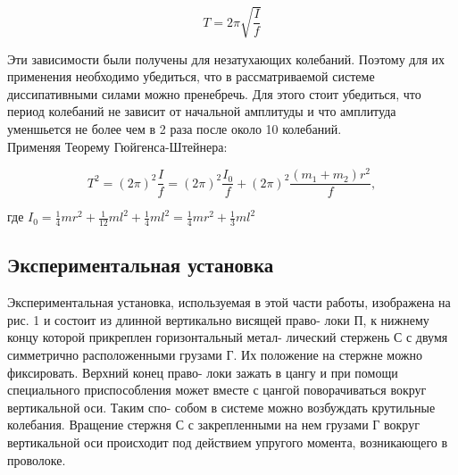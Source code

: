 \documentclass[a4paper, 12pt]{article}
\begin{document}
\begin{equation}
    T = 2\pi\sqrt{\frac{I}{f}}
\end{equation}

\bigskip

Эти зависимости были получены для незатухающих колебаний. Поэтому для их применения необходимо убедиться, что в рассматриваемой системе диссипативными силами можно пренебречь. Для этого стоит убедиться, что период колебаний не зависит от начальной амплитуды и что амплитуда уменшьется не более чем в 2 раза после около 10 колебаний.\\
Применяя Теорему Гюйгенса-Штейнера:

\bigskip

\begin{equation}
    T^2 = (2\pi)^2\frac{I}{f} = (2\pi)^2\frac{I_{0}}{f} + (2\pi)^2\frac{(m_{1}+m_{2})r^2}{f},
\end{equation}

\bigskip

\begin{center}
где $I_{0} = \frac{1}{4}mr^2 + \frac{1}{12}ml^2 + \frac{1}{4}ml^2 = \frac{1}{4}mr^2 + \frac{1}{3}ml^2$
\end{center}

\bigskip

\begin{center}
\subsection*{Экспериментальная установка}
\end{center}

Экспериментальная установка, используемая в этой части работы,
изображена на рис. 1 и состоит из длинной вертикально висящей право-
локи П, к нижнему концу которой прикреплен горизонтальный метал-
лический стержень С с двумя симметрично расположенными грузами
Г. Их положение на стержне можно фиксировать. Верхний конец право-
локи зажать в цангу и при помощи специального приспособления может
вместе с цангой поворачиваться вокруг вертикальной оси. Таким спо-
собом в системе можно возбуждать крутильные колебания. Вращение
стержня С с закрепленными на нем грузами Г вокруг вертикальной
оси происходит под действием упругого момента, возникающего в проволоке.
\end{document}
